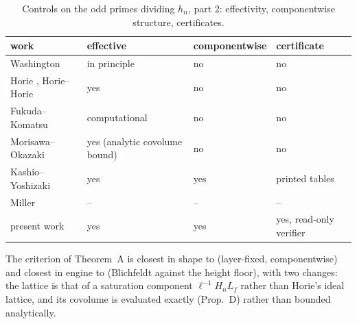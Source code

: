 \documentclass[11pt]{amsart}
\theoremstyle{remark}\newtheorem{remark}[theorem]{Remark}
\theoremstyle{definition}\newtheorem{definition}[theorem]{Definition}
\begin{document}
\begin{table}[h]\footnotesize
\begin{tabular}{@{}p{3.0cm}p{3.4cm}p{2.2cm}p{2.6cm}@{}}\toprule
work & effective & componentwise & certificate\\ \midrule
Washington \cite{Wa75,Wa78} & in principle & no & no\\
Horie \cite{Ho05,Ho07}, Horie--Horie \cite{HH09} & yes & no & no\\
Fukuda--Komatsu \cite{FK3} & computational & no & no\\
Morisawa--Okazaki \cite{MO16} & yes (analytic covolume bound) & no & no\\
Kashio--Yoshizaki \cite{KY} & yes & yes & printed tables\\
Miller \cite{Mi} & -- & -- & --\\
present work & yes & yes & yes, read-only verifier\\
\bottomrule\end{tabular}
\caption{Controls on the odd primes dividing $h_n$, part 2: effectivity, componentwise structure, certificates.}\label{tab:compb}
\end{table}

The criterion of Theorem~A is closest in shape to \cite{KY} (layer-fixed, componentwise) and closest in engine to \cite{MO16} (Blichfeldt against the height floor), with two changes: the lattice is that of a saturation component $\ell^{-1}H_nL_f$ rather than Horie's ideal lattice, and its covolume is evaluated exactly (Prop.~D) rather than bounded analytically.
\end{document}
